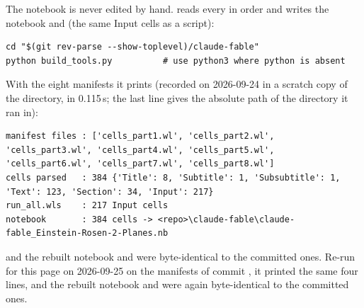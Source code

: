The notebook is never edited by hand.  reads every  in
order and writes the notebook and  (the same Input cells as a script):
\begin{Verbatim}
cd "$(git rev-parse --show-toplevel)/claude-fable"
python build_tools.py          # use python3 where python is absent
\end{Verbatim}
With the eight manifests it prints (recorded on 2026-09-24 in a scratch copy of the directory, in 0.115\,s;
the last line gives the absolute path of the directory it ran in):
\begin{Verbatim}[fontsize=\scriptsize]
manifest files : ['cells_part1.wl', 'cells_part2.wl', 'cells_part3.wl', 'cells_part4.wl', 'cells_part5.wl', 'cells_part6.wl', 'cells_part7.wl', 'cells_part8.wl']
cells parsed   : 384 {'Title': 8, 'Subtitle': 1, 'Subsubtitle': 1, 'Text': 123, 'Section': 34, 'Input': 217}
run_all.wls    : 217 Input cells
notebook       : 384 cells -> <repo>\claude-fable\claude-fable_Einstein-Rosen-2-Planes.nb
\end{Verbatim}
and the rebuilt notebook and  were byte-identical to the committed ones. Re-run for this
page on 2026-09-25 on the manifests of commit , it printed the same four lines, and the
rebuilt notebook and  were again byte-identical to the committed ones.

